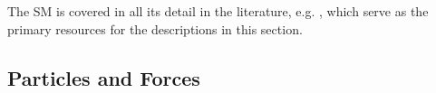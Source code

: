The SM is covered in all its detail in the literature, e.g. , which serve as the primary resources for the descriptions in this section.








\subsection{Particles and Forces}
\label{subsec:particle-content}

